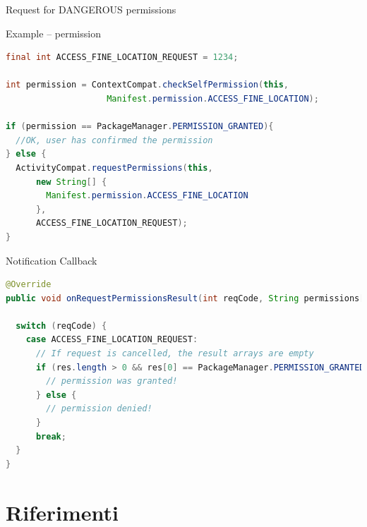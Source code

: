\documentclass{beamer}
\begin{document}
  \begin{frame}{Request for DANGEROUS permissions}

    \begin{exampleblock}{Example --  permission}
      \begin{lstlisting}[language=Java]
final int ACCESS_FINE_LOCATION_REQUEST = 1234;

int permission = ContextCompat.checkSelfPermission(this, 
                    Manifest.permission.ACCESS_FINE_LOCATION);

if (permission == PackageManager.PERMISSION_GRANTED){
  //OK, user has confirmed the permission
} else {
  ActivityCompat.requestPermissions(this,
      new String[] {
        Manifest.permission.ACCESS_FINE_LOCATION
      },
      ACCESS_FINE_LOCATION_REQUEST);
}
      \end{lstlisting}
    \end{exampleblock}
    \vspace{20pt}
    \begin{exampleblock}{Notification Callback}
      \begin{lstlisting}[language=Java]
@Override
public void onRequestPermissionsResult(int reqCode, String permissions[], int[] res) {

  switch (reqCode) {
    case ACCESS_FINE_LOCATION_REQUEST:
      // If request is cancelled, the result arrays are empty
      if (res.length > 0 && res[0] == PackageManager.PERMISSION_GRANTED){
        // permission was granted!
      } else {
        // permission denied!
      }
      break;
  }
}
      \end{lstlisting}
    \end{exampleblock}
  \end{frame}

\section*{Riferimenti}

\end{document}
